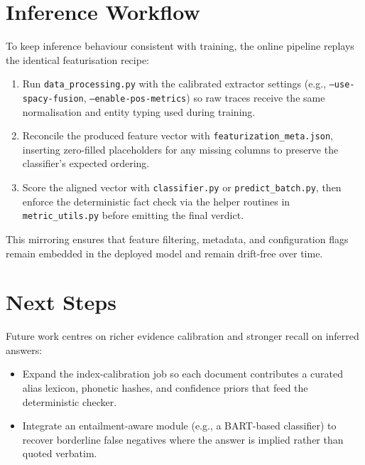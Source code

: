 \documentclass[11pt]{article}
\begin{document}
\section{Inference Workflow}
To keep inference behaviour consistent with training, the online pipeline replays the identical featurisation recipe:
\begin{enumerate}
  \item Run \texttt{data\_processing.py} with the calibrated extractor settings (e.g., \texttt{--use-spacy-fusion}, \texttt{--enable-pos-metrics}) so raw traces receive the same normalisation and entity typing used during training.
  \item Reconcile the produced feature vector with \texttt{featurization\_meta.json}, inserting zero-filled placeholders for any missing columns to preserve the classifier's expected ordering.
  \item Score the aligned vector with \texttt{classifier.py} or \texttt{predict\_batch.py}, then enforce the deterministic fact check via the helper routines in \texttt{metric\_utils.py} before emitting the final verdict.
\end{enumerate}
This mirroring ensures that feature filtering, metadata, and configuration flags remain embedded in the deployed model and remain drift-free over time.

\section{Next Steps}
Future work centres on richer evidence calibration and stronger recall on inferred answers:
\begin{itemize}
  \item Expand the index-calibration job so each document contributes a curated alias lexicon, phonetic hashes, and confidence priors that feed the deterministic checker.
  \item Integrate an entailment-aware module (e.g., a BART-based classifier) to recover borderline false negatives where the answer is implied rather than quoted verbatim.
\end{itemize}
\end{document}
